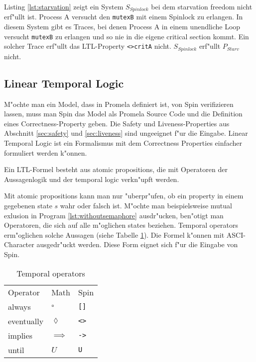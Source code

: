 \documentclass[a4paper, twoside]{article}
\begin{document}
Listing \ref{lst:starvation} zeigt ein System $S_{Spinlock}$ bei dem starvation freedom nicht erf"ullt ist. Process A versucht den \verb|mutexB| mit einem Spinlock zu erlangen. In diesem System gibt es Traces, bei denen Process A in einem unendliche Loop versucht \verb|mutexB| zu erlangen und so nie in die eigene critical section kommt. Ein solcher Trace erf"ullt das LTL-Property \verb|<>critA| nicht. $S_{Spinlock}$ erf"ullt $P_{Starv}$ nicht.



\subsection{Linear Temporal Logic}
\label{sec:lineartemporallogic}

M"ochte man ein Model, dass in Promela definiert ist, von Spin verifizieren lassen, muss man Spin das Model als Promela Source Code und die Definition eines Correctness-Property geben. Die Safety und Liveness-Properties aus Abschnitt \ref{sec:safety} und \ref{sec:liveness} sind ungeeignet f"ur die Eingabe. Linear Temporal Logic ist ein Formalismus mit dem Correctness Properties einfacher formuliert werden k"onnen.

Ein LTL-Formel besteht aus atomic propositions, die mit Operatoren der Aussagenlogik  und der temporal logic verkn"upft werden.

Mit atomic propositions kann man nur "uberpr"ufen, ob ein property in einem gegebenen state $s$ wahr oder falsch ist. M"ochte man beispielsweise mutual exlusion in Program \ref{lst:withoutsemaphore} ausdr"ucken, ben"otigt man Operatoren, die sich auf alle m"oglichen states beziehen. Temporal operators erm"oglichen solche Aussagen (siehe Tabelle \ref{tab:temporal_operators}). Die Formel k"onnen mit ASCI-Character ausgedr"uckt werden. Diese Form eignet sich f"ur die Eingabe von Spin.

\begin{table}
  \centering
  \begin{tabular}{l l l}
    Operator & Math & Spin \\
    always & $\square$ & \verb|[]| \\
    eventually & $\lozenge$ & \verb|<>| \\
    implies & $\implies$ & \verb|->| \\
    until & $U$ & \verb|U|
  \end{tabular}
  \caption{Temporal operators }
  \label{tab:temporal_operators}
\end{table}
\end{document}
